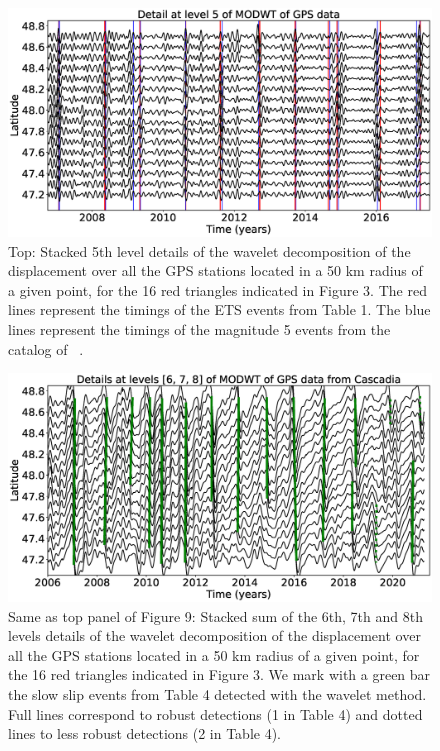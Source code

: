 \documentclass{article}
\begin{document}
\begin{figure}
\noindent\includegraphics[width=\textwidth, trim={0cm 0cm 0cm 0cm},clip]{figures/GPS_michel_detail_5.eps}
\caption{Top: Stacked 5th level details of the wavelet decomposition of the displacement over all the GPS stations located in a 50 km radius of a given point, for the 16 red triangles indicated in Figure 3. The red lines represent the timings of the ETS events from Table 1. The blue lines represent the timings of the magnitude 5 events from the catalog of ~\citet{MIC_2019}.}
\label{pngfiguresample}
\end{figure}

\begin{figure}
\noindent\includegraphics[width=\textwidth, trim={0cm 0cm 0cm 0cm},clip]{figures/GPS_longer_details_6-7-8_slowslip.eps}
\caption{Same as top panel of Figure 9: Stacked sum of the 6th, 7th and 8th levels details of the wavelet decomposition of the displacement over all the GPS stations located in a 50 km radius of a given point, for the 16 red triangles indicated in Figure 3. We mark with a green bar the slow slip events from Table 4 detected with the wavelet method. Full lines correspond to robust detections (1 in Table 4) and dotted lines to less robust detections (2 in Table 4).}
\label{pngfiguresample}
\end{figure}
\end{document}
